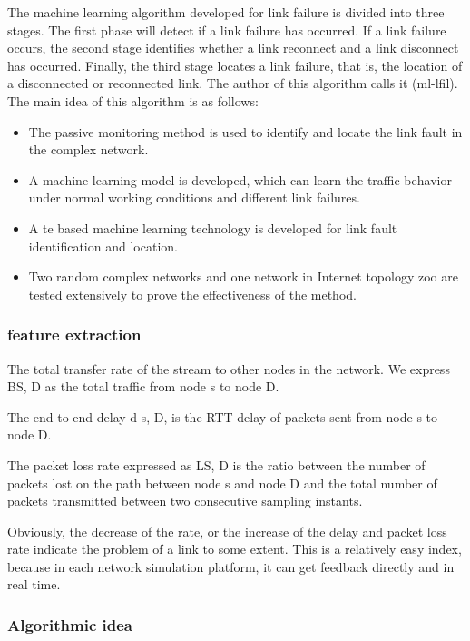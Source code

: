\documentclass[UTF8]{article}
\begin{document}
The machine learning algorithm developed for link failure is divided into three stages. The first phase will detect if a link failure has occurred. If a link failure occurs, the second stage identifies whether a link reconnect and a link disconnect has occurred. Finally, the third stage locates a link failure, that is, the location of a disconnected or reconnected link. The author of this algorithm calls it (ml-lfil). The main idea of this algorithm is as follows:

\begin{itemize}
\item The passive monitoring method is used to identify and locate the link fault in the complex network.
	
\item	A machine learning model is developed, which can learn the traffic behavior under normal working conditions and different link failures.

\item  A te based machine learning technology is developed for link fault identification and location.

\item Two random complex networks and one network in Internet topology zoo are tested extensively to prove the effectiveness of the method.
	
\end{itemize}

\subsubsection{feature extraction}

The total transfer rate of the stream to other nodes in the network. We express BS, D as the total traffic from node s to node D.

The end-to-end delay d s, D, is the RTT delay of packets sent from node s to node D.

The packet loss rate expressed as LS, D is the ratio between the number of packets lost on the path between node s and node D and the total number of packets transmitted between two consecutive sampling instants.

Obviously, the decrease of the rate, or the increase of the delay and packet loss rate indicate the problem of a link to some extent. This is a relatively easy index, because in each network simulation platform, it can get feedback directly and in real time.

\subsubsection{Algorithmic idea}
\end{document}
